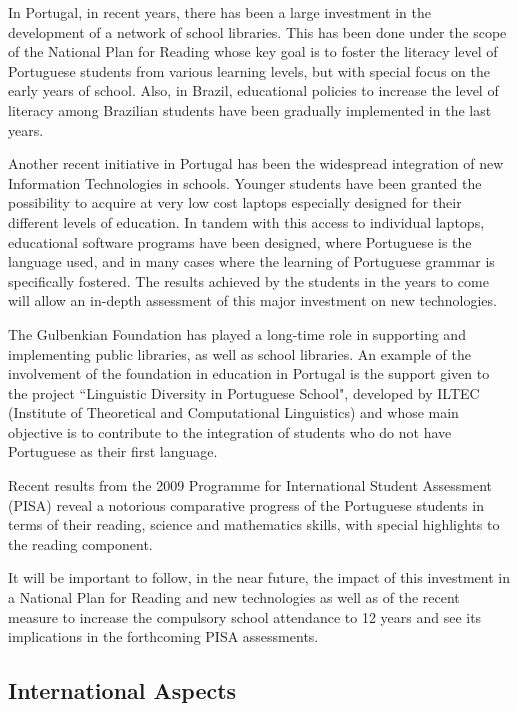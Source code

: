 \documentclass[]{../metanetpaper}
\begin{document}
\begin{multicols}{2}
In Portugal, in recent years, there has been a large investment in the development of a network of school libraries. This has been done under the scope of the National Plan for Reading whose key goal is to foster the literacy level of Portuguese students from various learning levels, but with special focus on the early years of school. Also, in Brazil, educational policies to increase the level of literacy among Brazilian students have been gradually implemented in the last years.

Another recent initiative in Portugal has been the widespread integration of new Information Technologies in schools. Younger students have been granted the possibility to acquire at very low cost laptops especially designed for their different levels of education. In tandem with this access to individual laptops, educational software programs have been designed, where Portuguese is the language used, and in many cases where the learning of Portuguese grammar is specifically fostered. The results achieved by the students in the years to come will allow an in-depth assessment of this major investment on new technologies.


The Gulbenkian Foundation has played a long-time role in supporting and implementing public libraries, as well as school libraries. An example of the involvement of the foundation in education in Portugal is the support given to the project “Linguistic Diversity in Portuguese School"\cite{gulbenkian2}, developed by ILTEC (Institute of Theoretical and Computational Linguistics) and whose main objective is to contribute to the integration of students who do not have Portuguese as their first language.

Recent results from the 2009 Programme for International Student Assessment (PISA) reveal a notorious comparative progress of the Portuguese students in terms of their reading, science and mathematics skills, with special highlights to the reading component. 

It will be important to follow, in the near future, the impact of this investment in a National Plan for Reading and new technologies as well as of the recent measure to increase the compulsory school attendance to 12 years and see its implications in the forthcoming PISA assessments.

\subsection{International Aspects}


\end{multicols}
\end{document}

